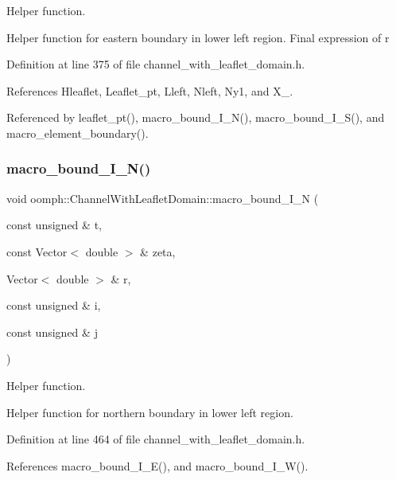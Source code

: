 Helper function. 

Helper function for eastern boundary in lower left region. Final expression of r 

Definition at line 375 of file channel\+\_\+with\+\_\+leaflet\+\_\+domain.\+h.



References Hleaflet, Leaflet\+\_\+pt, Lleft, Nleft, Ny1, and X\+\_.



Referenced by leaflet\+\_\+pt(), macro\+\_\+bound\+\_\+\+I\+\_\+\+N(), macro\+\_\+bound\+\_\+\+I\+\_\+\+S(), and macro\+\_\+element\+\_\+boundary().

\mbox{\label{classoomph_1_1ChannelWithLeafletDomain_a08d97680e95f42a385a869d5c384e610}} 
\subsubsection{\texorpdfstring{macro\+\_\+bound\+\_\+\+I\+\_\+\+N()}{macro\_bound\_I\_N()}}
{\footnotesize\ttfamily void oomph\+::\+Channel\+With\+Leaflet\+Domain\+::macro\+\_\+bound\+\_\+\+I\+\_\+N (\begin{DoxyParamCaption}\item[{const unsigned \&}]{t,  }\item[{const Vector$<$ double $>$ \&}]{zeta,  }\item[{Vector$<$ double $>$ \&}]{r,  }\item[{const unsigned \&}]{i,  }\item[{const unsigned \&}]{j }\end{DoxyParamCaption})\hspace{0.3cm}{\ttfamily [protected]}}



Helper function. 

Helper function for northern boundary in lower left region. 

Definition at line 464 of file channel\+\_\+with\+\_\+leaflet\+\_\+domain.\+h.



References macro\+\_\+bound\+\_\+\+I\+\_\+\+E(), and macro\+\_\+bound\+\_\+\+I\+\_\+\+W().



